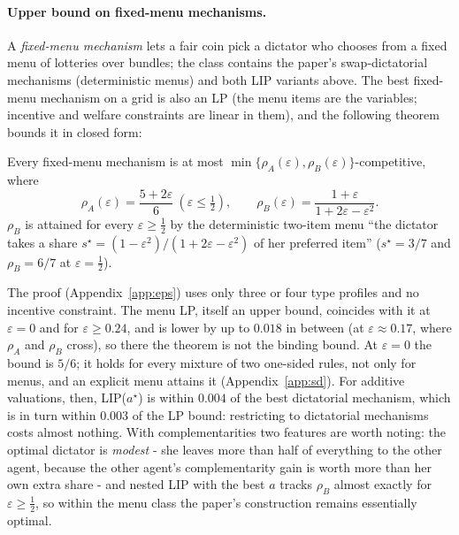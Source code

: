 \paragraph{Upper bound on fixed-menu mechanisms.} A \emph{fixed-menu mechanism} lets a fair coin pick a dictator who chooses from a fixed menu of
lotteries over bundles; the class contains the paper's swap-dictatorial mechanisms (deterministic
menus) and both LIP variants above. The best fixed-menu mechanism on a grid is also
an LP (the menu items are the variables; incentive and welfare constraints are linear in them),
and the following theorem bounds it in closed form:
\begin{theorem}\label{thm:menu_bound}
Every fixed-menu mechanism is at most
$\min\{\rho_A(\varepsilon),\rho_B(\varepsilon)\}$-competitive, where
\[
\rho_A(\varepsilon)=\frac{5+2\varepsilon}{6}\ (\varepsilon\le\tfrac12),\qquad
\rho_B(\varepsilon)=\frac{1+\varepsilon}{1+2\varepsilon-\varepsilon^2}.
\]
$\rho_B$ is attained for every $\varepsilon\ge\tfrac12$ by the deterministic two-item menu ``the dictator takes a
share $s^\star=(1-\varepsilon^2)/(1+2\varepsilon-\varepsilon^2)$ of her preferred item'' ($s^\star=3/7$
and $\rho_B=6/7$ at $\varepsilon=\tfrac12$).
\end{theorem}
The proof (Appendix~\ref{app:eps}) uses only three or four type profiles and no incentive
constraint. The menu LP, itself an upper bound, coincides with it at $\varepsilon=0$ and for
$\varepsilon\ge0.24$, and is lower by up to $0.018$ in between (at $\varepsilon\approx0.17$, where
$\rho_A$ and $\rho_B$ cross), so there the theorem is not the binding bound. At $\varepsilon=0$ the bound is $5/6$; it holds for every mixture of two one-sided rules,
not only for menus, and an explicit menu attains it (Appendix~\ref{app:sd}). For additive
valuations, then, LIP($a^\star$) is within $0.004$ of the best dictatorial mechanism, which is in turn
within $0.003$ of the LP bound: restricting to dictatorial mechanisms costs almost nothing.
With complementarities two features are worth noting:
the optimal dictator is \emph{modest} - she leaves more than half of everything to the other
agent, because the other agent's complementarity gain is worth more than her own extra share -
and nested LIP with the best $a$ tracks $\rho_B$ almost exactly for $\varepsilon\ge\tfrac12$, so
within the menu class the paper's construction remains essentially optimal.


